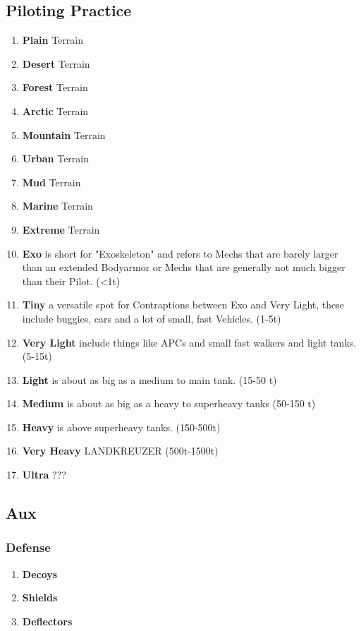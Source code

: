 \subsection{Piloting Practice}\label{subsec:piloting-practice}
\begin{enumerate}[label= -]
    \item \textbf{Plain} Terrain
    \item \textbf{Desert} Terrain
    \item \textbf{Forest} Terrain
    \item \textbf{Arctic} Terrain
    \item \textbf{Mountain} Terrain
    \item \textbf{Urban} Terrain
    \item \textbf{Mud} Terrain
    \item \textbf{Marine} Terrain
    \item \textbf{Extreme} Terrain
    \item \textbf{Exo} is short for "Exoskeleton" and refers to Mechs that are barely larger than an extended Bodyarmor
    or Mechs that are generally not much bigger than their Pilot. (<1t)
    \item \textbf{Tiny} a versatile spot for Contraptions between Exo and Very Light, these include buggies, cars and
    a lot of small, fast Vehicles. (1-5t)
    \item \textbf{Very Light} include things like APCs and small fast walkers and light tanks.(5-15t)
    \item \textbf{Light} is about as big as a medium to main tank. (15-50 t)
    \item \textbf{Medium} is about as big as a heavy to superheavy tanks (50-150 t)
    \item \textbf{Heavy} is above superheavy tanks. (150-500t)
    \item \textbf{Very Heavy} LANDKREUZER (500t-1500t)
    \item \textbf{Ultra} ???
\end{enumerate}
\subsection{Aux}\label{subsec:aux}
\subsubsection{Defense}
\begin{enumerate}[label= -]
    \item \textbf{Decoys}
    \item \textbf{Shields}
    \item \textbf{Deflectors}
\end{enumerate}
